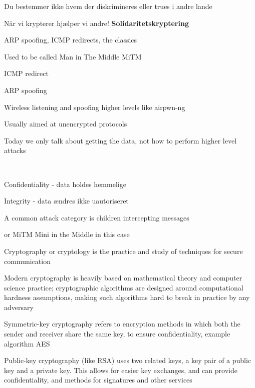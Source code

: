 \documentclass[Screen16to9,17pt]{foils}
\begin{document}
\centerline{Du bestemmer ikke hvem der diskrimineres eller trues i andre lande}

\vskip2cm

Når vi krypterer hjælper vi andre! {\bf Solidaritetskryptering}





\begin{list1}
\item ARP spoofing, ICMP redirects, the classics
\item Used to be called Man in The Middle MiTM
\begin{list2}
\item ICMP redirect
\item ARP spoofing
\item Wireless listening and spoofing higher levels like  airpwn-ng 
\end{list2}
\item Usually aimed at unencrypted protocols
\item Today we only talk about getting the data, not how to perform higher level attacks
\end{list1}


{~}

\begin{list2}
\item Confidentiality - data holdes hemmelige
\item Integrity - data ændres ikke uautoriseret
\item A common attack category is children intercepting messages
\item or MiTM Mini in the Middle in this case
\end{list2}

\begin{list1}
\item Cryptography or cryptology is the practice and study of techniques for secure communication
\item Modern cryptography is heavily based on mathematical theory and computer science practice; cryptographic algorithms are designed around computational hardness assumptions, making such algorithms hard to break in practice by any adversary
\item Symmetric-key cryptography refers to encryption methods in which both the sender and receiver share the same key, to ensure confidentiality, example algorithm AES
\item Public-key cryptography (like RSA) uses two related keys, a key pair of a public key and a private key. This allows for easier key exchanges, and can provide confidentiality, and methods for signatures and other services
\end{list1}
\end{document}
